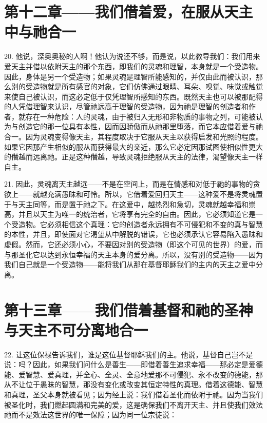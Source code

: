 
\section{第十二章——我们借着爱，在服从天主中与祂合一}

20. 他说，深奥奥秘的人啊！他认为说还不够，而是说，以此教导我们：我们用来爱天主并借以依附天主的那个东西，即我们的灵魂和理智，本身就是一个受造物。因此，身体是另一个受造物；如果灵魂是理智所能感知的，并仅由此而被认识，那么别的受造物就是所有感官的对象，它们仿佛通过眼睛、耳朵、嗅觉、味觉或触觉来使自己被认识，而这必定低于仅凭理智所感知的东西。既然天主也可以被那配得的人凭借理智来认识，尽管祂远高于理智的受造物，因为祂是理智的创造者和作者，就存在一种危险：人的灵魂，由于被归入无形和非物质的事物之列，可能被认为与创造它的那一位具有本性，因而因骄傲而从祂那里堕落，而它本应借着爱与祂合一。因为灵魂变得像天主，其程度取决于它服从天主以获得启发和光照的程度。如果它因那产生相似的服从而获得最大的亲近，那么它必定因那试图使相似性更大的僭越而远离祂。正是这种僭越，导致灵魂拒绝服从天主的法律，渴望像天主一样自主。\par

21. 因此，灵魂离天主越远——不是在空间上，而是在情感和对低于祂的事物的贪欲上——就越充满愚昧和可怜。所以，它借着爱回归天主——这种爱不是将灵魂置于与天主同等，而是置于祂之下。在这爱中，越热烈和急切，灵魂就越幸福和崇高，并且以天主为唯一的统治者，它将享有完全的自由。因此，它必须知道它是一个受造物。它必须相信这个真理：它的创造者永远拥有不可侵犯和不变的真与智慧的本性，并且，即使面对它渴望从中解脱的错误，它也必须承认它容易陷入愚昧和虚假。然而，它还必须小心，不要因对别的受造物（即这个可见的世界）的爱，而与那圣化它以达到永恒幸福的天主本身的爱分离。所以，没有别的受造物——因为我们自己就是一个受造物——能将我们从那在基督耶稣我们的主内的天主之爱中分离。\par


\section{第十三章——我们借着基督和祂的圣神与天主不可分离地合一}

22. 让这位保禄告诉我们，谁是这位基督耶稣我们的主。他说，基督自己岂不是说：吗？因此，如果我们问什么是善生——即借着善生追求幸福——那必定是爱德能、爱智慧、爱真理，并全心、全灵、全意地爱那不可侵犯、永不改变的德能，那从不让位于愚昧的智慧，那没有变化或改变其恒定特性的真理。借着这德能、智慧和真理，圣父本身就被看见；因为经上说：我们借着圣化而依附于祂。因为当我们被圣化时，我们燃起圆满和完美的爱，这是确保我们不离开天主、并且使我们效法祂而不是效法这世界的唯一保障；因为同一位宗徒说：\par

